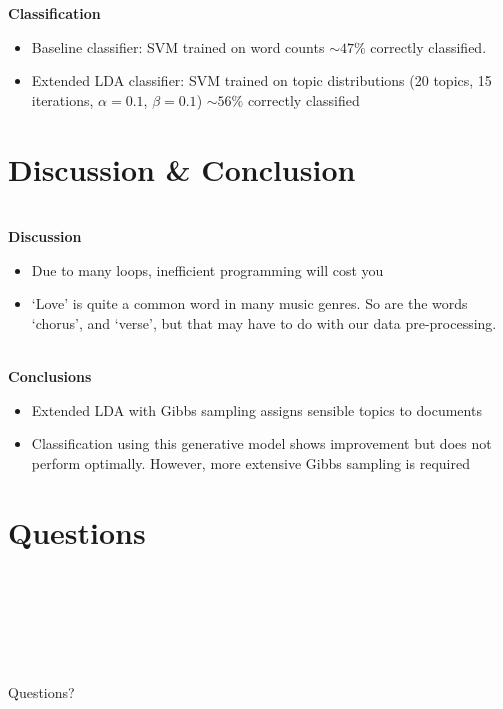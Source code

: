 \documentclass[t,ignorenonframetext]{beamer}
\begin{document}
\begin{frame}
\textbf{Classification}
\begin{itemize}
	\item Baseline classifier: SVM trained on word counts $\sim 47 \%$ correctly classified.
	\item Extended LDA classifier: SVM trained on topic distributions (20 topics, 15 iterations, $\alpha=0.1$, $\beta=0.1$) $\sim 56 \%$ correctly classified
\end{itemize}

\end{frame}

\section{Discussion \& Conclusion}
\begin{frame}~\\
\textbf{Discussion}~\\
\begin{itemize}
	\item Due to many loops, inefficient programming will cost you
	\item `Love' is quite a common word in many music genres. So are the words `chorus', and `verse', but that may have to do with our data pre-processing.
\end{itemize}~\\
\textbf{Conclusions}~\\
\begin{itemize}
\setlength{\itemsep}{10pt}\setlength{\itemsep}{5pt}
\item Extended LDA with Gibbs sampling assigns sensible topics to documents
\item Classification using this generative model shows improvement but does not perform optimally. However, more extensive Gibbs sampling is required 

\end{itemize}
\end{frame}

\section[Questions]{Questions}
\begin{frame}
~ \\~ \\~ \\ ~ \\~ \\
\begin{center}\Huge Questions? \end{center} 
\end{frame}
\end{document}
